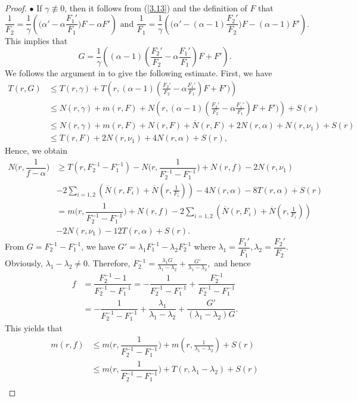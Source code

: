 \documentclass[12pt,leqno]{amsart}
\numberwithin{equation}{section}
\begin{document}
\begin{proof}
$\bullet$ If $\gamma \not\equiv 0$, then it follows from (\ref{3.13}) and the definition of $F$ that
$$\frac{1}{F_2}=\frac{1}{\gamma}\left(\Big(\alpha'-\alpha\dfrac{F_1'}{F_1}\Big)F-\alpha F'\right)\text{ and } \frac{1}{F_1}=\frac{1}{\gamma}\left(\Big(\alpha'-(\alpha-1)\dfrac{F_2'}{F_2}\Big)F-(\alpha-1)F'\right).$$
This implies that
$$G=\frac{1}{\gamma}\left((\alpha-1)(\frac{F_2'}{F_2}-\alpha\frac{F_1'}{F_1})F+F'\right).$$
We follows the argument in \cite{QK} to give the following estimate. First, we have
\begin{align*}
T(r,G)&\le T(r,\gamma)+T\left(r,(\alpha-1)(\frac{F_2'}{F_2}-\alpha\frac{F_1'}{F_1})F+F')\right)\\
&\le N(r,\gamma)+m(r,F)+N\left(r,(\alpha-1)(\frac{F_2'}{F_2}-\alpha\frac{F_1'}{F_1})F+F')\right)+S(r)\\
&\le N(r,\gamma)+m(r,F)+N(r,F)+\overline N(r,F)+2N(r,\alpha)+N(r,\nu_1)+S(r)\\
&\le T(r,F)+2N(r,\nu_1)+4N(r,\alpha)+S(r),
\end{align*}
Hence, we obtain
\begin{align*}
N\Big(r,\dfrac{1}{f-\alpha}\Big) &\ge T(r,F_2^{-1}-F_1^{-1})-N\Big(r,\dfrac{1}{F_2^{-1}-F_1^{-1}}\Big)+N(r,f)-2N(r,\nu_1)\\
&-2\sum_{i=1,2}\left (\overline{N}(r,F_i)+\overline N(r,\frac{1}{F_i})\right)-4N(r,\alpha)-8T(r,\alpha)+S(r)\\
&=m\Big(r,\dfrac{1}{F_2^{-1}-F_1^{-1}}\Big)+N(r,f)-2\sum_{i=1,2}\left (\overline{N}(r,F_i)+\overline N(r,\frac{1}{F_i})\right)\\
&-2N(r,\nu_1)-12T(r,\alpha)+S(r).
\end{align*}
From $G=F_2^{-1}-F_1^{-1}$, we have $G'=\lambda_1 F_1^{-1}-\lambda_2 F_2^{-1}$ where $\lambda_1=\dfrac{F_1'}{F_1},\lambda_2=\dfrac{F_2'}{F_2}$. Obviously, $\lambda_1-\lambda_2 \neq 0$. Therefore,
$F_2^{-1}=\frac{\lambda_1 G}{\lambda_1-\lambda_2}+\frac{G'}{\lambda_1-\lambda_2},$
and hence
\begin{align*}
f&=\dfrac{F_2^{-1}-1}{F_2^{-1}-F_1^{-1}}=-\dfrac{1}{F_2^{-1}-F_1^{-1}}+\dfrac{F_2^{-1}}{F_2^{-1}-F_1^{-1}}\\
&=-\dfrac{1}{F_2^{-1}-F_1^{-1}}+\dfrac{\lambda_1}{\lambda_1-\lambda_2}+\dfrac{G'}{(\lambda_1-\lambda_2)G}.
\end{align*}
This yields that
\begin{align*}
m(r,f)&\le m\Big(r,\dfrac{1}{F_2^{-1}-F_1^{-1}}\Big)+m(r,\frac{1}{\lambda_1-\lambda_2})+S(r)\\
&\le m\Big(r,\dfrac{1}{F_2^{-1}-F_1^{-1}}\Big)+T(r,\lambda_1-\lambda_2)+S(r)\\

\end{align*}
\end{proof}
\end{document}
